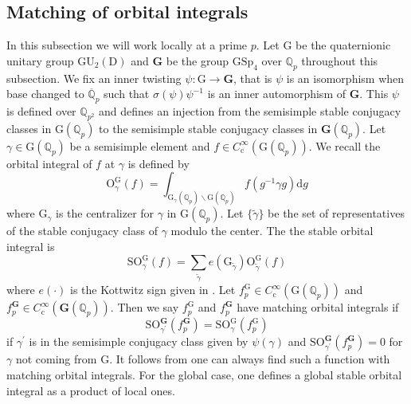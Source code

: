 \documentclass[10pt]{amsart}
\numberwithin{equation}{section}
\theoremstyle{definition}
\def\GSp{\mathrm{GSp}}
\def\GU{\mathrm{GU}}
\def\bfG{\mathbf{G}}
\def\QQ{\mathbb{Q}}
\def\rmc{\mathrm{c}}
\def\rmD{\mathrm{D}}
\def\rmG{\mathrm{G}}
\def\rmO{\mathrm{O}}
\def\rmS{\mathrm{S}}
\begin{document}
\subsection{Matching of orbital integrals}
In this subsection we will work locally at a prime $p$. Let $\rmG$ be the quaternionic unitary group $\GU_{2}(\rmD)$ and $\bfG$ be the group $\GSp_{4}$ over $\QQ_{p}$ throughout this subsection. We fix an inner twisting $\psi: \rmG\rightarrow \bfG$, that is $\psi$ is an isomorphism when base changed to $\overline{\QQ}_{p}$ such that $\sigma(\psi)\psi^{-1}$ is an inner automorphism of $\bfG$. This $\psi$ is defined over $\QQ_{p^{2}}$ and defines an injection from the semisimple stable conjugacy classes in $\rmG(\QQ_{p})$ to the semisimple stable conjugacy classes in $\bfG(\QQ_{p})$. Let $\gamma\in \rmG(\QQ_{p})$ be a semisimple element and $f\in{C}^{\infty}_{\rmc}(\rmG(\QQ_{p}))$. We recall the orbital integral of $f$ at $\gamma$ is defined by 
\begin{equation*}
{\rmO}^{\rmG}_{\gamma}({f})=\int_{\rmG_{\gamma}(\QQ_{p})\backslash\rmG(\QQ_{p})}f(g^{-1}\gamma g)\mathrm{d}g
\end{equation*}
where $\rmG_{\gamma}$ is the centralizer for $\gamma$ in $\rmG(\QQ_{p})$. Let $\{\tilde{\gamma}\}$ be the set of representatives of the stable conjugacy class of $\gamma$ modulo the center. The the stable orbital integral is 
\begin{equation*}
{\rmS\rmO}^{\rmG}_{\gamma}(f)=\sum_{\tilde{\gamma}} {e}(\rmG_{\tilde{\gamma}})\rmO^{\rmG}_{\tilde{\gamma}}(f)
\end{equation*}
where $e(\cdot)$ is the Kottwitz sign given in \cite[\S 5]{Ko83}. Let $f^{\rmG}_{p}\in{C}^{\infty}_{\rmc}(\rmG(\QQ_{p}))$ and $f^{\bfG}_{p}\in{C}^{\infty}_{\rmc}(\bfG(\QQ_{p}))$. Then we say $f^{\rmG}_{p}$ and $f^{\bfG}_{p}$ have matching orbital integrals if
\begin{equation*}
 \mathrm{SO}^{\bfG}_{\gamma^{\prime}}(f^{\bfG}_{p})=\mathrm{SO}^{\rmG}_{\gamma}(f^{\rmG}_{p})
\end{equation*} 
if $\gamma^{\prime}$ is in the semisimple conjugacy class given by $\psi(\gamma)$ and $\mathrm{SO}^{\bfG}_{\gamma^{\prime}}(f^{\bfG}_{p})=0$ for $\gamma$ not coming from $\rmG$. It follows from \cite[\S 1.5 Th\`eor\'em ]{Wal-trans} one can always find such a function with matching orbital integrals.
For the global case, one defines a global stable orbital integral as a product of local ones. 
\end{document}
